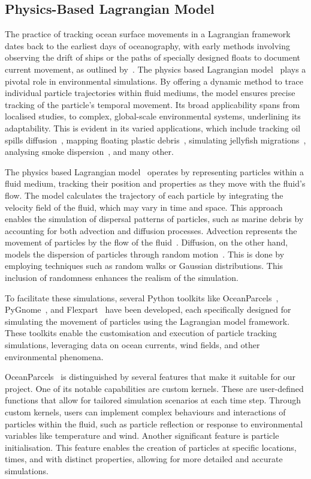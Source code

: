 \subsection{Physics-Based Lagrangian Model}
\label{subsec:2.1.3}
The practice of tracking ocean surface movements in a Lagrangian framework dates back to the earliest days of oceanography, with early methods involving observing the drift of ships or the paths of specially designed floats to document current movement, as outlined by~\cite{14}. The physics based Lagrangian model~\cite{1} plays a pivotal role in environmental simulations. By offering a dynamic method to trace individual particle trajectories within fluid mediums, the model ensures precise tracking of the particle’s temporal movement. Its broad applicability spans from localised studies, to complex, global-scale environmental systems, underlining its adaptability. This is evident in its varied applications, which include tracking oil spills diffusion~\cite{15}, mapping floating plastic debris~\cite{16}, simulating jellyfish migrations~\cite{17}, analysing smoke dispersion~\cite{18}, and many other.

The physics based Lagrangian model~\cite{1} operates by representing particles within a fluid medium, tracking their position and properties as they move with the fluid’s flow. The model calculates the trajectory of each particle by integrating the velocity field of the fluid, which may vary in time and space. This approach enables the simulation of dispersal patterns of particles, such as marine debris by accounting for both advection and diffusion processes. Advection represents the movement of particles by the flow of the fluid~\cite{19}. Diffusion, on the other hand, models the dispersion of particles through random motion~\cite{19}. This is done by employing techniques such as random walks or Gaussian distributions. This inclusion of randomness enhances the realism of the simulation.

To facilitate these simulations, several Python toolkits like OceanParcels~\cite{20}, PyGnome~\cite{21}, and Flexpart~\cite{22} have been developed, each specifically designed for simulating the movement of particles using the Lagrangian model framework. These toolkits enable the customisation and execution of particle tracking simulations, leveraging data on ocean currents, wind fields, and other environmental phenomena.

OceanParcels~\cite{20} is distinguished by several features that make it suitable for our project. One of its notable capabilities are custom kernels. These are user-defined functions that allow for tailored simulation scenarios at each time step. Through custom kernels, users can implement complex behaviours and interactions of particles within the fluid, such as particle reflection or response to environmental variables like temperature and wind. Another significant feature is particle initialisation. This feature enables the creation of particles at specific locations, times, and with distinct properties, allowing for more detailed and accurate simulations. 

